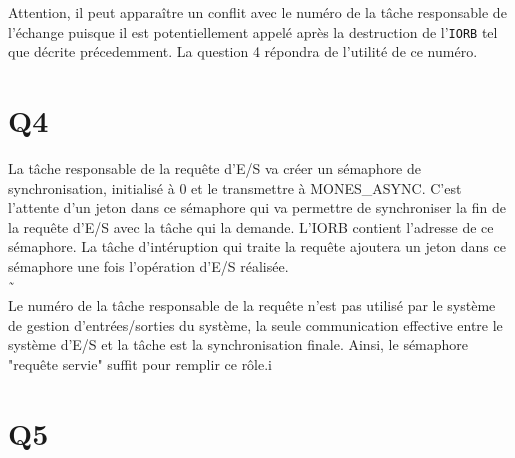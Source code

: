 Attention, il peut apparaître un conflit avec le numéro de la tâche responsable de l'échange puisque
il est potentiellement appelé après la destruction de l'\texttt{IORB} tel que décrite précedemment.
La question 4 répondra de l'utilité de ce numéro.

\section{Q4}
La tâche responsable de la requête d'E/S va créer un sémaphore de synchronisation, initialisé à 0 et le transmettre à
MONES\_ASYNC. C'est l'attente d'un jeton dans ce sémaphore qui va permettre de synchroniser la fin de la
requête d'E/S avec la tâche qui la demande. L'IORB contient l'adresse de ce sémaphore. La tâche d'intéruption
qui traite la requête ajoutera un jeton dans ce sémaphore une fois l'opération d'E/S réalisée.\\
˜\\
Le numéro de la tâche responsable de la requête n'est pas utilisé par le système de gestion d'entrées/sorties
du système, la seule communication effective entre le système d'E/S et la tâche est la synchronisation finale.
Ainsi, le sémaphore "requête servie" suffit pour remplir ce rôle.i

\section{Q5}
\begin{algo}
\CONST
\ENDCONST
\VAR
\BEGIN

	\STATE{}

	\STATE{}
	\ENDFOR

	\STATE{}
\END
\end{algo}


